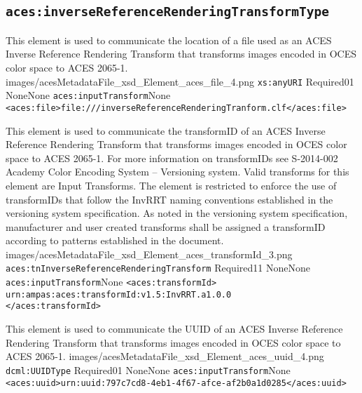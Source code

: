 \subsection{\texttt{aces:inverseReferenceRenderingTransformType}}

		{This element is used to communicate the location of a file used as an ACES Inverse Reference Rendering Transform that transforms images encoded in OCES color space to ACES 2065-1.}
		{images/acesMetadataFile_xsd_Element_aces_file_4.png}
		{\texttt{xs:anyURI}}
		{Required}{0}{1}
		{None}{None}
		{\texttt{aces:inputTransform}}{None}
		{\lstinline{<aces:file>file:///inverseReferenceRenderingTranform.clf</aces:file>}}

        {This element is used to communicate the transformID of an ACES Inverse Reference Rendering Transform that transforms images encoded in OCES color space to ACES 2065-1.  For more information on transformIDs see S-2014-002 Academy Color Encoding System -- Versioning system.  Valid transforms for this element are Input Transforms.  The element is restricted to enforce the use of transformIDs that follow the InvRRT naming conventions established in the versioning system specification.  As noted in the versioning system specification, manufacturer and user created transforms shall be assigned a transformID according to patterns established in the document.}
        {images/acesMetadataFile_xsd_Element_aces_transformId_3.png}
        {\texttt{aces:tnInverseReferenceRenderingTransform}}
        {Required}{1}{1}
        {None}{None}
        {\texttt{aces:inputTransform}}{None}
        {\lstinline{<aces:transformId>}\\
        \lstinline{urn:ampas:aces:transformId:v1.5:InvRRT.a1.0.0}\\
        \lstinline{</aces:transformId>}}
        
		{This element is used to communicate the UUID of an ACES Inverse Reference Rendering Transform that transforms images encoded in OCES color space to ACES 2065-1.}
		{images/acesMetadataFile_xsd_Element_aces_uuid_4.png}
		{\texttt{dcml:UUIDType}}
		{Required}{0}{1}
		{None}{None}
		{\texttt{aces:inputTransform}}{None}
		{\lstinline{<aces:uuid>urn:uuid:797c7cd8-4eb1-4f67-afce-af2b0a1d0285</aces:uuid>}}
